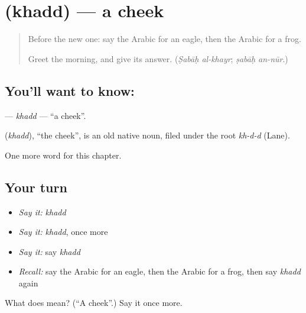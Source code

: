 \section[\texorpdfstring{\ar{خد} (khadd)}{خد (khadd)}]{ (khadd) — a cheek}

\label{lesson:AR-C138-khadd}



\begin{quote}
Before the new one: say the Arabic for an eagle, then the Arabic for a frog.

Greet the morning, and give its answer. (\emph{Ṣabāḥ al-khayr}; \emph{ṣabāḥ an-nūr}.)
\end{quote}

\subsection*{You'll want to know: }
\textbf{} — \emph{khadd} — \textquotedblleft{}a cheek\textquotedblright{}.

\begin{cousinweb}
\textbf{} (\emph{khadd}), \textquotedblleft{}the cheek\textquotedblright{}, is an old native noun, filed under the root \emph{kh-d-d} (Lane).
\end{cousinweb}

\begin{grammarlens}[title={What you've built}]
One more word for this chapter.
\end{grammarlens}

\subsection*{Your turn}
\begin{itemize}
\raggedright
  \item \emph{Say it:} \emph{khadd}
  \item \emph{Say it:} \emph{khadd}, once more
  \item \emph{Say it:} say \emph{khadd}
  \item \emph{Recall:} say the Arabic for an eagle, then the Arabic for a frog, then say \emph{khadd} again
\end{itemize}

\begin{tcolorbox}[breakable,colback=teal!4,colframe=teal!35!black,title={Before you move on}]
What does  mean? (\textquotedblleft{}A cheek\textquotedblright{}.) Say it once more.
\end{tcolorbox}
